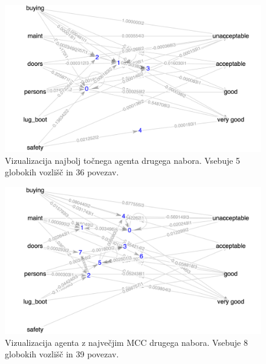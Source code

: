 \begin{figure}[H]
    \begin{center}
        \includegraphics[width=13cm]{car/2/acc_g}
    \end{center}
    \caption{Vizualizacija najbolj točnega agenta drugega nabora. Vsebuje 5 globokih vozlišč in 36 povezav.}
    \label{fig:car_acc_2_g}
\end{figure}

\begin{figure}[H]
    \begin{center}
        \includegraphics[width=13cm]{car/2/mcc_g}
    \end{center}
    \caption{Vizualizacija agenta z največjim MCC drugega nabora. Vsebuje 8 globokih vozlišč in 39 povezav.}
    \label{fig:car_mcc_2_g}
\end{figure}


